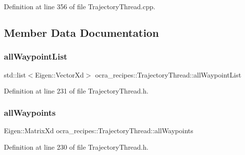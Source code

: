 Definition at line 356 of file Trajectory\+Thread.\+cpp.



\subsection{Member Data Documentation}
\hypertarget{classocra__recipes_1_1TrajectoryThread_a21821862b17ba40b639c35125611f9d4}{}\label{classocra__recipes_1_1TrajectoryThread_a21821862b17ba40b639c35125611f9d4} 
\subsubsection{\texorpdfstring{all\+Waypoint\+List}{allWaypointList}}
{\footnotesize\ttfamily std\+::list$<$Eigen\+::\+Vector\+Xd$>$ ocra\+\_\+recipes\+::\+Trajectory\+Thread\+::all\+Waypoint\+List\hspace{0.3cm}{\ttfamily [protected]}}



Definition at line 231 of file Trajectory\+Thread.\+h.

\hypertarget{classocra__recipes_1_1TrajectoryThread_a857686d75878a7ae4edf12e37fddb10c}{}\label{classocra__recipes_1_1TrajectoryThread_a857686d75878a7ae4edf12e37fddb10c} 
\subsubsection{\texorpdfstring{all\+Waypoints}{allWaypoints}}
{\footnotesize\ttfamily Eigen\+::\+Matrix\+Xd ocra\+\_\+recipes\+::\+Trajectory\+Thread\+::all\+Waypoints\hspace{0.3cm}{\ttfamily [protected]}}



Definition at line 230 of file Trajectory\+Thread.\+h.

\hypertarget{classocra__recipes_1_1TrajectoryThread_a98ffdc4593f0608e8355654b54191c21}{}\label{classocra__recipes_1_1TrajectoryThread_a98ffdc4593f0608e8355654b54191c21} 
